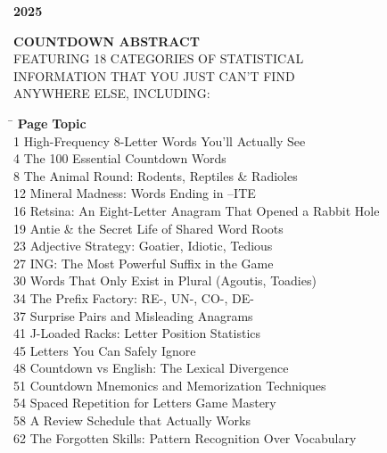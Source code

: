 \documentclass[12pt]{article}
\begin{document}
\thispagestyle{empty}

\begin{center}
{\coverfont\fontsize{54pt}{64pt}\selectfont \textbf{2025}}\\[1ex]
\end{center}
\begin{flushleft}
{\coverfont\fontsize{34pt}{40pt}\selectfont \textbf{COUNTDOWN ABSTRACT}}\\[3ex]

{\large FEATURING 18 CATEGORIES OF STATISTICAL}\\
{\large INFORMATION THAT YOU JUST CAN’T FIND}\\
{\large ANYWHERE ELSE, INCLUDING:}
\end{flushleft}

\vspace{3em}

\begin{tabbing}
\hspace{1.5cm}\= \kill
\textbf{Page} \> \textbf{Topic} \\
1 \> High-Frequency 8-Letter Words You’ll Actually See \\
4 \> The 100 Essential Countdown Words \\
8 \> The Animal Round: Rodents, Reptiles \& Radioles \\
12 \> Mineral Madness: Words Ending in –ITE \\
16 \> Retsina: An Eight-Letter Anagram That Opened a Rabbit Hole \\
19 \> Antie \& the Secret Life of Shared Word Roots \\
23 \> Adjective Strategy: Goatier, Idiotic, Tedious \\
27 \> ING: The Most Powerful Suffix in the Game \\
30 \> Words That Only Exist in Plural (Agoutis, Toadies) \\
34 \> The Prefix Factory: RE-, UN-, CO-, DE- \\
37 \> Surprise Pairs and Misleading Anagrams \\
41 \> J-Loaded Racks: Letter Position Statistics \\
45 \> Letters You Can Safely Ignore \\
48 \> Countdown vs English: The Lexical Divergence \\
51 \> Countdown Mnemonics and Memorization Techniques \\
54 \> Spaced Repetition for Letters Game Mastery \\
58 \> A Review Schedule that Actually Works \\
62 \> The Forgotten Skills: Pattern Recognition Over Vocabulary \\
\end{tabbing}
\end{document}

